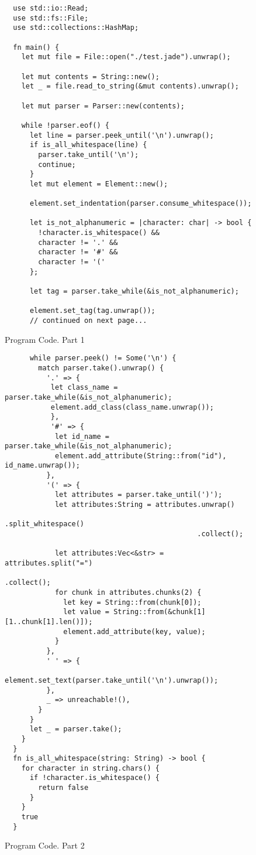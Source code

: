\begin{figure}[ht!]
    \small
  \begin{verbatim}
  use std::io::Read;
  use std::fs::File;
  use std::collections::HashMap;

  fn main() {
    let mut file = File::open("./test.jade").unwrap();

    let mut contents = String::new();
    let _ = file.read_to_string(&mut contents).unwrap();

    let mut parser = Parser::new(contents);

    while !parser.eof() {
      let line = parser.peek_until('\n').unwrap();
      if is_all_whitespace(line) {
        parser.take_until('\n');
        continue;
      }
      let mut element = Element::new();

      element.set_indentation(parser.consume_whitespace());

      let is_not_alphanumeric = |character: char| -> bool {
        !character.is_whitespace() && 
        character != '.' &&
        character != '#' &&
        character != '('
      };

      let tag = parser.take_while(&is_not_alphanumeric);

      element.set_tag(tag.unwrap());
      // continued on next page...        
  \end{verbatim}
  \caption{Program Code. Part 1}
\end{figure}

\begin{figure}[ht!]
    \small
  \begin{verbatim}
      while parser.peek() != Some('\n') {
        match parser.take().unwrap() {
          '.' => {
           let class_name = parser.take_while(&is_not_alphanumeric);
           element.add_class(class_name.unwrap());
           },
           '#' => {
            let id_name = parser.take_while(&is_not_alphanumeric);
            element.add_attribute(String::from("id"), id_name.unwrap());
          },
          '(' => {
            let attributes = parser.take_until(')');
            let attributes:String = attributes.unwrap()
                                              .split_whitespace()
                                              .collect();

            let attributes:Vec<&str> = attributes.split("=")
                                                 .collect();
            for chunk in attributes.chunks(2) {
              let key = String::from(chunk[0]);
              let value = String::from(&chunk[1][1..chunk[1].len()]);
              element.add_attribute(key, value);
            }
          },
          ' ' => {
            element.set_text(parser.take_until('\n').unwrap());
          },
          _ => unreachable!(),
        }
      }
      let _ = parser.take();
    }
  }
  fn is_all_whitespace(string: String) -> bool {
    for character in string.chars() {
      if !character.is_whitespace() {
        return false
      }
    }
    true
  }
  \end{verbatim}
  \caption{Program Code. Part 2}
\end{figure}